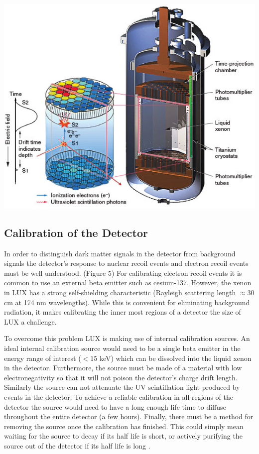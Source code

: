 \documentclass[a4paper,12pt]{article}
\begin{document}
\begin{center}
\includegraphics[scale=0.5]{lux.jpg}
\end{center}

\subsection{Calibration of the Detector}

In order to distinguish dark matter signals in the detector from background signals the detector's response to nuclear recoil events and electron recoil events must be well understood. (Figure 5) For calibrating electron recoil events it is common to use an external beta emitter such as cesium-137.  However, the xenon in LUX has a strong self-shielding characteristic (Rayleigh scattering length $ \approx 30 $ cm at 174 nm wavelengths).  While this is convenient for eliminating background radiation, it makes calibrating the inner most regions of a detector the size of LUX a challenge.

To overcome this problem LUX is making use of internal calibration sources.  An ideal internal calibration source would need to be a single beta emitter in the energy range of interest ($ <15 $ keV) which can be dissolved into the liquid xenon in the detector.  Furthermore, the source must be made of a material with low electronegativity so that it will not poison the detector's charge drift length.  Similarly the source can not attenuate the UV scintillation light produced by events in the detector.  To achieve a reliable calibration in all regions of the detector the source would need to have a long enough life time to diffuse throughout the entire detector (a few hours).  Finally, there must be a method for removing the source once the calibration has finished.  This could simply mean waiting for the source to decay if its half life is short, or actively purifying the source out of the detector if its half life is long \cite{Kastens}.
\end{document}
